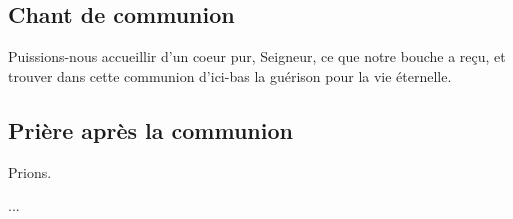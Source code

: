 \subsection{Chant de communion}


Puissions-nous accueillir d'un coeur pur, Seigneur, ce que notre
bouche a reçu, et trouver dans cette communion d'ici-bas la guérison
pour la vie éternelle.

\subsection{Prière après la communion}


Prions.

...

